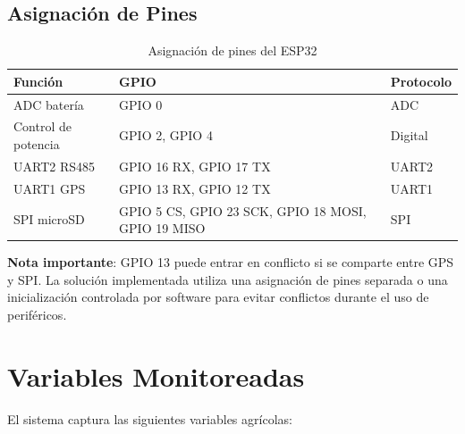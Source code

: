\documentclass[journal]{IEEEtran}
\begin{document}
\subsection{Asignación de Pines}

\begin{table}[h]
\centering
\caption{Asignación de pines del ESP32}
\label{tab:pines}
\scriptsize
\begin{tabularx}{\columnwidth}{|>{\raggedright\arraybackslash}X|
                                  >{\raggedright\arraybackslash}X|
                                  >{\raggedright\arraybackslash}X|}
\hline
\textbf{Función} & \textbf{GPIO} & \textbf{Protocolo} \\
\hline
ADC batería & GPIO 0 & ADC \\
\hline
Control de potencia & GPIO 2, GPIO 4 & Digital \\
\hline
UART2 RS485 & GPIO 16 RX, GPIO 17 TX & UART2 \\
\hline
UART1 GPS & GPIO 13 RX, GPIO 12 TX & UART1 \\
\hline
SPI microSD & GPIO 5 CS, GPIO 23 SCK, GPIO 18 MOSI, GPIO 19 MISO & SPI \\
\hline
\end{tabularx}
\end{table}

\textbf{Nota importante}: GPIO 13 puede entrar en conflicto si se comparte entre GPS y SPI. La solución implementada utiliza una asignación de pines separada o una inicialización controlada por software para evitar conflictos durante el uso de periféricos.

\section{Variables Monitoreadas}

El sistema captura las siguientes variables agrícolas:
\end{document}
